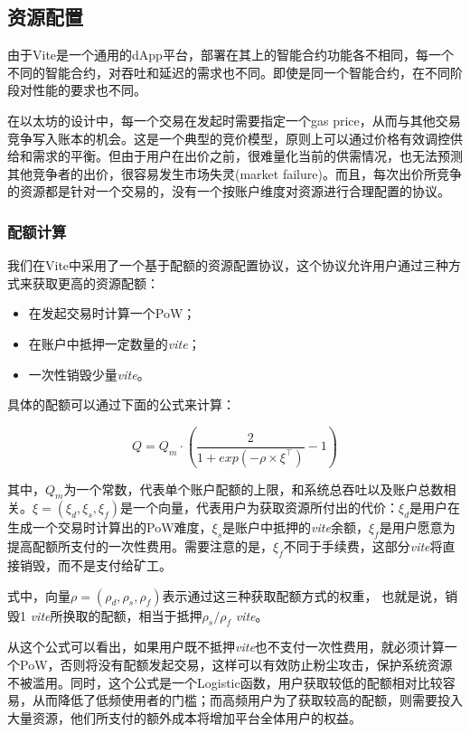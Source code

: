 \documentclass[UTF8,nofonts]{ctexart}
\begin{document}
\begin{multicols}{2}
\subsection{资源配置}
由于Vite是一个通用的dApp平台，部署在其上的智能合约功能各不相同，每一个不同的智能合约，对吞吐和延迟的需求也不同。即使是同一个智能合约，在不同阶段对性能的要求也不同。

在以太坊的设计中，每一个交易在发起时需要指定一个gas price，从而与其他交易竞争写入账本的机会。这是一个典型的竞价模型，原则上可以通过价格有效调控供给和需求的平衡。但由于用户在出价之前，很难量化当前的供需情况，也无法预测其他竞争者的出价，很容易发生市场失灵(market failure)。而且，每次出价所竞争的资源都是针对一个交易的，没有一个按账户维度对资源进行合理配置的协议。

\subsubsection{配额计算}
我们在Vite中采用了一个基于配额的资源配置协议，这个协议允许用户通过三种方式来获取更高的资源配额：
\begin{itemize}
\item 在发起交易时计算一个PoW；
\item 在账户中抵押一定数量的\textit{vite}；
\item 一次性销毁少量\textit{vite}。
\end{itemize}

具体的配额可以通过下面的公式来计算：

\begin{equation}
Q = Q_{m} \cdot \left ( \frac{2}{1+exp\left ( -\rho \times \xi^{\top} \right )} - 1  \right )
\end{equation}

其中，$Q_{m}$为一个常数，代表单个账户配额的上限，和系统总吞吐以及账户总数相关。$\xi=(\xi_{d}, \xi_{s}, \xi_{f})$是一个向量，代表用户为获取资源所付出的代价：$\xi_{d}$是用户在生成一个交易时计算出的PoW难度，$\xi_{s}$是账户中抵押的\textit{vite}余额，$\xi_{f}$是用户愿意为提高配额所支付的一次性费用。需要注意的是，$\xi_{f}$不同于手续费，这部分\textit{vite}将直接销毁，而不是支付给矿工。

式中，向量$\rho=(\rho_{d}, \rho_{s}, \rho_{f})$表示通过这三种获取配额方式的权重，
也就是说，销毁1 \: \textit{vite}所换取的配额，相当于抵押$\rho_{s} / \rho_{f}$ \: \textit{vite}。

从这个公式可以看出，如果用户既不抵押\textit{vite}也不支付一次性费用，就必须计算一个PoW，否则将没有配额发起交易，这样可以有效防止粉尘攻击，保护系统资源不被滥用。同时，这个公式是一个Logistic函数，用户获取较低的配额相对比较容易，从而降低了低频使用者的门槛；而高频用户为了获取较高的配额，则需要投入大量资源，他们所支付的额外成本将增加平台全体用户的权益。


\end{multicols}
\end{document}
